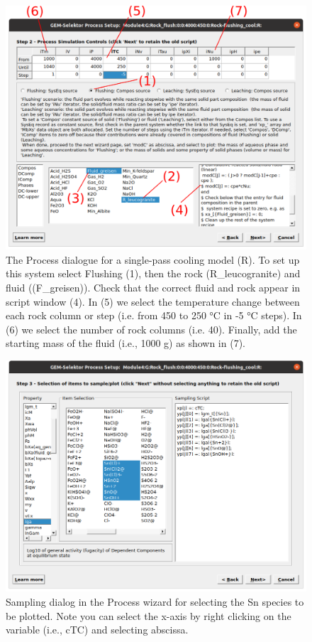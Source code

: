 \documentclass[
]{book}
\begin{document}
\begin{figure}
\includegraphics[width=1\linewidth]{figures/module4/fig-17} \caption{The Process dialogue for a single-pass cooling model (R). To set up this system select Flushing (1), then the rock (R\_leucogranite) and fluid ((F\_greisen)). Check that the correct fluid and rock appear in script window (4). In (5) we select the temperature change between each rock column or step (i.e. from 450 to 250 °C  in -5 °C  steps). In (6) we select the number of rock columns (i.e. 40). Finally, add the starting mass of the fluid (i.e., 1000 g) as shown in (7).}\label{fig:fig-17d}
\end{figure}

\begin{figure}
\includegraphics[width=1\linewidth]{figures/module4/fig-18} \caption{Sampling dialog in the Process wizard for selecting the Sn species to be plotted. Note you can select the x-axis by right clicking on the variable (i.e., cTC) and selecting abscissa.}\label{fig:fig-18d}
\end{figure}
\end{document}
